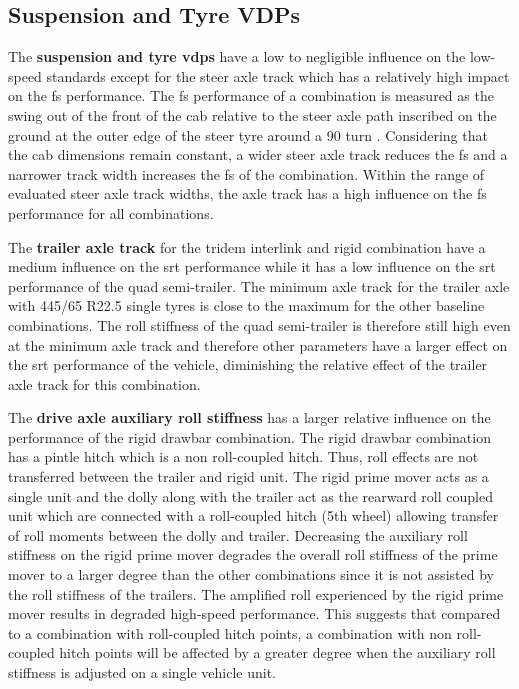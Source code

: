\subsection{Suspension and Tyre VDPs}\label{section:disc-relative-influence-suspension-tyre}

The \textbf{suspension and tyre \glspl{vdp}} have a low to negligible influence on the low-speed standards except for the steer axle track which has a relatively high impact on the \gls{fs} performance. The \gls{fs} performance of a combination is measured as the swing out of the front of the cab relative to the steer axle path inscribed on the ground at the outer edge of the steer tyre around a 90\degree{} turn \cite{NationalTransportCommission2008}. Considering that the cab dimensions remain constant, a wider steer axle track reduces the \gls{fs} and a narrower track width increases the \gls{fs} of the combination. Within the range of evaluated steer axle track widths, the axle track has a high influence on the \gls{fs} performance for all combinations.

The \textbf{trailer axle track} for the tridem interlink and rigid combination have a medium influence on the \gls{srt} performance while it has a low influence on the \gls{srt} performance of the quad semi-trailer. The minimum axle track for the trailer axle with 445/65 R22.5 single tyres is close to the maximum for the other baseline combinations. The roll stiffness of the quad semi-trailer is therefore still high even at the minimum axle track and therefore other parameters have a larger effect on the \gls{srt} performance of the vehicle, diminishing the relative effect of the trailer axle track for this combination.

The \textbf{drive axle auxiliary roll stiffness} has a larger relative influence on the performance of the rigid drawbar combination. The rigid drawbar combination has a pintle hitch which is a non roll-coupled hitch. Thus, roll effects are not transferred between the trailer and rigid unit. The rigid prime mover acts as a single unit and the dolly along with the trailer act as the rearward roll coupled unit which are connected with a roll-coupled hitch (5th wheel) allowing transfer of roll moments between the dolly and trailer. Decreasing the auxiliary roll stiffness on the rigid prime mover degrades the overall roll stiffness of the prime mover to a larger degree than the other combinations since it is not assisted by the roll stiffness of the trailers. The amplified roll experienced by the rigid prime mover results in degraded high-speed performance. This suggests that compared to a combination with roll-coupled hitch points, a combination with non roll-coupled hitch points will be affected by a greater degree when the auxiliary roll stiffness is adjusted on a single vehicle unit.


